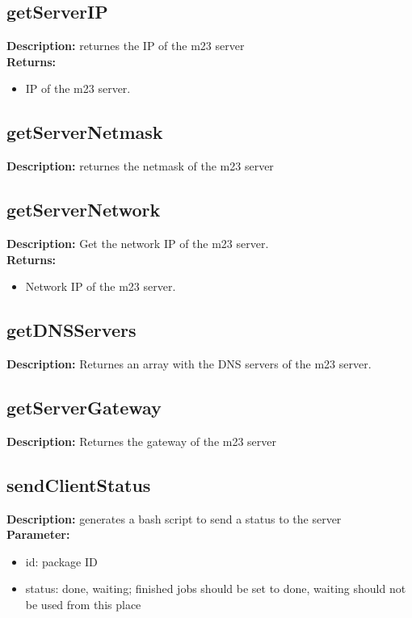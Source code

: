 \subsection{getServerIP}
\textbf{Description:} returnes the IP of the m23 server\\
\textbf{Returns:}
\begin{itemize}
\item IP of the m23 server.
\end{itemize}

\subsection{getServerNetmask}
\textbf{Description:} returnes the netmask of the m23 server\\

\subsection{getServerNetwork}
\textbf{Description:} Get the network IP of the m23 server.\\
\textbf{Returns:}
\begin{itemize}
\item Network IP of the m23 server.
\end{itemize}

\subsection{getDNSServers}
\textbf{Description:} Returnes an array with the DNS servers of the m23 server.\\

\subsection{getServerGateway}
\textbf{Description:} Returnes the gateway of the m23 server\\

\subsection{sendClientStatus}
\textbf{Description:} generates a bash script to send a status to the server\\
\textbf{Parameter:}
\begin{itemize}
\item id: package ID
\item status: done, waiting; finished jobs should be set to done, waiting should not be used from this place
\end{itemize}

